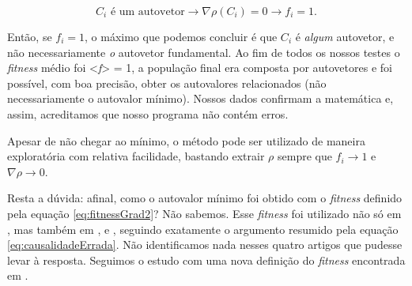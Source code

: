 \begin{equation}\label{eq:causalidadeCorreta}
	C_i \mbox{ é um autovetor} \rightarrow \nabla \rho(C_i) = 0 \rightarrow f_i = 1.
\end{equation}
	
Então, se $f_i = 1$, o máximo que podemos concluir é que $C_i$ é \textit{algum} autovetor, e não necessariamente \textit{o} autovetor fundamental. Ao fim de todos os nossos testes o \textit{fitness} médio foi <\textit{f}> = 1, a população final era composta por autovetores e foi possível, com boa precisão, obter os autovalores relacionados (não necessariamente o autovalor mínimo). Nossos dados confirmam a matemática e, assim, acreditamos que nosso programa não contém erros.

Apesar de não chegar ao mínimo, o método pode ser utilizado de maneira exploratória com relativa facilidade, bastando extrair $\rho$ sempre que $f_i \rightarrow 1$ e $\nabla \rho \rightarrow 0$. 

Resta a dúvida: afinal, como o autovalor mínimo foi obtido com o \textit{fitness} definido pela equação \ref{eq:fitnessGrad2}? Não sabemos. Esse \textit{fitness} foi utilizado não só em \cite{metodo2004}, mas também em \cite{metodo2006}, \cite{metodo2008} e \cite{metodo2009}, seguindo exatamente o argumento resumido pela equação \ref{eq:causalidadeErrada}. Não identificamos nada nesses quatro artigos que pudesse levar à resposta. Seguimos o estudo com uma nova definição do \textit{fitness} encontrada em \cite{metodo2011}.

